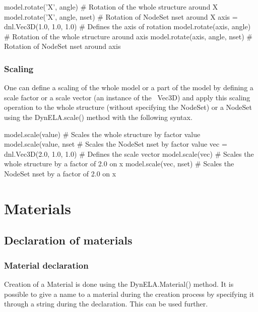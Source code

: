 \begin{PythonListing}
model.rotate('X', angle)        # Rotation of the whole structure around X
model.rotate('X', angle, nset)  # Rotation of NodeSet nset around X
axis = dnl.Vec3D(1.0, 1.0, 1.0) # Defines the axis of rotation
model.rotate(axis, angle)       # Rotation of the whole structure around axis
model.rotate(axis, angle, nset) # Rotation of NodeSet nset around axis
\end{PythonListing}

\subsubsection{Scaling}

One can define a scaling of the whole model or a part of the model by defining a scale factor or a scale vector (an instance of the \DynELA~\textsf{Vec3D}) and apply this scaling operation to the whole structure (without specifying the \textsf{NodeSet}) or a \textsf{NodeSet} using the \textsf{DynELA.scale()} method with the following syntax.

\begin{PythonListing}
model.scale(value)             # Scales the whole structure by factor value
model.scale(value, nset        # Scales the NodeSet nset by factor value
vec = dnl.Vec3D(2.0, 1.0, 1.0) # Defines the scale vector
model.scale(vec)               # Scales the whole structure by a factor of 2.0 on x
model.scale(vec, nset)         # Scales the NodeSet nset by a factor of 2.0 on x
\end{PythonListing}

\section{Materials}

\subsection{Declaration of materials}

\subsubsection{Material declaration}

Creation of a Material is done using the \textsf{DynELA.Material()} method. It is possible to give a name to a material during the creation process by specifying it through a string during the declaration. This can be used further.

